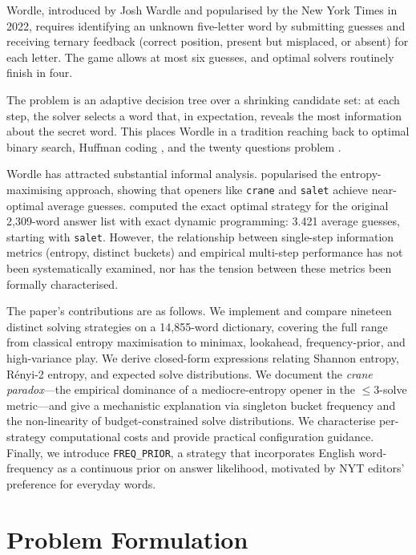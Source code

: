 \documentclass{article}
\begin{document}
Wordle, introduced by Josh Wardle and popularised by the New York Times in
2022, requires identifying an unknown five-letter word by submitting guesses and
receiving ternary feedback (correct position, present but misplaced, or absent)
for each letter. The game allows at most six guesses, and optimal solvers
routinely finish in four.

The problem is an adaptive decision tree over a shrinking candidate set: at
each step, the solver selects a word that, in expectation, reveals the most
information about the secret word. This places Wordle in a tradition reaching
back to optimal binary search, Huffman coding \citep{huffman1952method}, and
the twenty questions problem \citep{berlekamp1964block}.

Wordle has attracted substantial informal analysis. \citet{3blue1brown2022wordle}
popularised the entropy-maximising approach, showing that openers like
\texttt{crane} and \texttt{salet} achieve near-optimal average guesses.
\citet{bertsimas2025exact} computed the exact optimal strategy for the original
2,309-word answer list with exact dynamic programming: 3.421 average guesses,
starting with \texttt{salet}. However, the relationship between single-step
information metrics (entropy, distinct buckets) and empirical multi-step
performance has not been systematically examined, nor has the tension between
these metrics been formally characterised.

The paper's contributions are as follows. We implement and compare nineteen
distinct solving strategies on a 14,855-word dictionary, covering the full
range from classical entropy maximisation to minimax, lookahead, frequency-prior,
and high-variance play. We derive closed-form expressions relating Shannon
entropy, Rényi-2 entropy, and expected solve distributions. We document
the \emph{crane paradox}---the empirical dominance of a mediocre-entropy opener
in the $\leq 3$-solve metric---and give a mechanistic explanation via singleton
bucket frequency and the non-linearity of budget-constrained solve distributions.
We characterise per-strategy computational costs and provide practical
configuration guidance. Finally, we introduce \texttt{FREQ\_PRIOR}, a strategy
that incorporates English word-frequency as a continuous prior on answer likelihood,
motivated by NYT editors' preference for everyday words.

\section{Problem Formulation}
\end{document}

